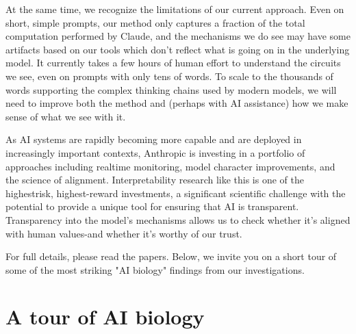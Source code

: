 At the same time, we recognize the limitations of our current approach. Even on short, simple prompts, our method only captures a fraction of the total computation performed by Claude, and the mechanisms we do see may have some artifacts based on our tools which don't reflect what is going on in the underlying model. It currently takes a few hours of human effort to understand the circuits we see, even on prompts with only tens of words. To scale to the thousands of words supporting the complex thinking chains used by modern models, we will need to improve both the method and (perhaps with AI assistance) how we make sense of what we see with it.

As AI systems are rapidly becoming more capable and are deployed in increasingly important contexts, Anthropic is investing in a portfolio of approaches including realtime monitoring, model character improvements, and the science of alignment. Interpretability research like this is one of the highestrisk, highest-reward investments, a significant scientific challenge with the potential to provide a unique tool for ensuring that AI is transparent. Transparency into the model's mechanisms allows us to check whether it's aligned with human values-and whether it's worthy of our trust.

For full details, please read the papers. Below, we invite you on a short tour of some of the most striking "AI biology" findings from our investigations.

\section*{A tour of AI biology}
